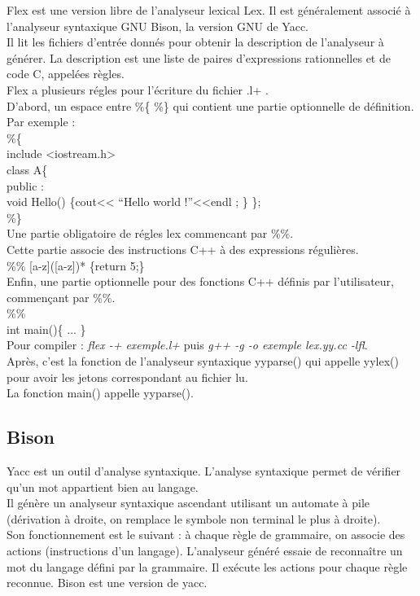 Flex est une version libre de l'analyseur lexical Lex. Il est généralement associé à l'analyseur syntaxique GNU Bison, la version GNU de Yacc. \\
Il lit les fichiers d'entrée donnés pour obtenir la description de l'analyseur à générer. La description est une liste de paires d'expressions rationnelles et de code C, appelées règles. \\
Flex a plusieurs régles pour l'écriture du fichier .l+ .\\
D'abord, un espace entre \%\{ \%\} qui contient une partie optionnelle de définition.\\
Par exemple :\\
\%\{\\
include <iostream.h>\\
class A\{ \\
 public :\\
  void Hello() \{cout<< ``Hello world !''<<endl ; \}
\};\\
\%\}\\
Une partie obligatoire de régles lex commencant par \%\%.\\
Cette partie associe des instructions C++ à des expressions régulières.\\
\%\%
[a-z]([a-z])*           \{return 5;\}\\
Enfin, une partie optionnelle pour des fonctions C++ définis par l'utilisateur, commençant par \%\%.\\
\%\%\\
int main()\{
...
\}\\
Pour compiler : \textit{flex -+ exemple.l+}  puis \textit{g++ -g -o exemple lex.yy.cc -lfl}.\\
Après, c'est la fonction de l'analyseur syntaxique yyparse() qui appelle yylex() pour avoir les jetons correspondant au fichier lu.\\
La fonction main() appelle yyparse().\\


\subsection{Bison}

Yacc est un outil d'analyse syntaxique. L'analyse syntaxique permet de vérifier qu'un mot appartient bien au langage.\\ Il génère un analyseur syntaxique ascendant utilisant un automate à pile (dérivation à droite, on remplace le symbole non terminal le plus à droite).\\ Son fonctionnement est le suivant : à chaque règle de grammaire, on associe des actions (instructions d'un langage). L'analyseur généré essaie de reconnaître un mot du langage défini par la grammaire. Il exécute les actions pour chaque règle reconnue.  Bison est une version de yacc.\\

